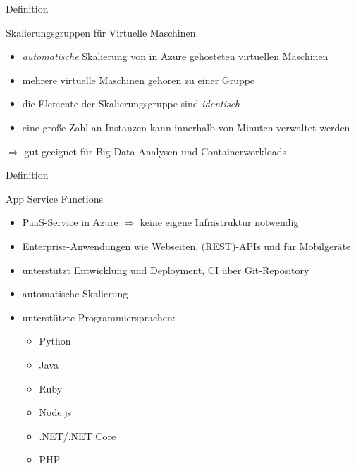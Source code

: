 \documentclass{scrartcl}
\newenvironment{flashcard}[2][]{%
    #1
    \vfill
    \centerline{\Large{#2}}
    \vfill
\newpage
}
{\newpage}
\begin{document}
    \begin{flashcard}[Definition]{Skalierungsgruppen für Virtuelle Maschinen}
        \begin{itemize}
            \item \emph{automatische} Skalierung von in Azure gehosteten virtuellen Maschinen
            \item mehrere virtuelle Maschinen gehören zu einer Gruppe
            \item die Elemente der Skalierungsgruppe sind \emph{identisch}
            \item eine große Zahl an Instanzen kann innerhalb von Minuten verwaltet werden
        \end{itemize}
        $\Rightarrow$ gut geeignet für Big Data-Analysen und Containerworkloads

    \end{flashcard}

    \begin{flashcard}[Definition]{App Service Functions}
        \begin{itemize}
            \item PaaS-Service in Azure\newline
            $\Rightarrow$ keine eigene Infrastruktur notwendig
            \item Enterprise-Anwendungen wie Webseiten, (REST)-APIs und für Mobilgeräte
            \item unterstützt Entwicklung und Deployment, CI über Git-Repository
            \item automatische Skalierung
            \item unterstützte Programmiersprachen:
            \begin{itemize}
                \item Python
                \item Java
                \item Ruby
                \item Node.js
                \item .NET/.NET Core
                \item PHP
            \end{itemize}
        \end{itemize}
    \end{flashcard}
\end{document}
